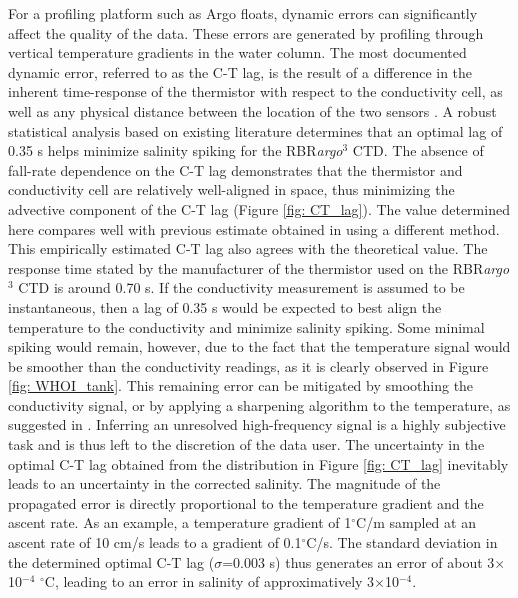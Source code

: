 \documentclass{ametsocV6.1}
\begin{document}
For a profiling platform such as Argo floats, dynamic errors can significantly affect the quality of the data. 
These errors are generated by profiling through vertical temperature gradients in the water column.
The most documented dynamic error, referred to as the C-T lag, is the result of a difference in the inherent time-response of the thermistor with respect to the conductivity cell, as well as any physical distance between the location of the two sensors \citep{Horne_1980,  Lueck_1990b}. 
A robust statistical analysis based on existing literature \citep{Barth_1996,  Dever_2020} determines that an optimal lag of 0.35 s helps minimize salinity spiking for the RBR\textit{argo}$^3$ CTD.  
The absence of fall-rate dependence on the C-T lag demonstrates that the thermistor and conductivity cell are relatively well-aligned in space, thus minimizing the advective component of the C-T lag (Figure \ref{fig: CT_lag}). 
The value determined here compares well with previous estimate obtained in \cite{Halverson_2020a} using a different method. 
This empirically estimated C-T lag also agrees with the theoretical value. The response time stated by the manufacturer of the thermistor used on the RBR\textit{argo}$^3$ CTD is around 0.70 s. 
If the conductivity measurement is assumed to be instantaneous, then a lag of 0.35 s would be expected to best align the temperature to the conductivity and minimize salinity spiking. 
Some minimal spiking would remain, however, due to the fact that the temperature signal would be smoother than the conductivity readings, as it is clearly observed in Figure \ref{fig: WHOI_tank}. 
This remaining error can be mitigated by smoothing the conductivity signal, or by applying a sharpening algorithm to the temperature, as suggested in \cite{Halverson_2020a}. 
Inferring an unresolved high-frequency signal is a highly subjective task and is thus left to the discretion of the data user. 
The uncertainty in the optimal C-T lag obtained from the distribution in Figure \ref{fig: CT_lag} inevitably leads to an uncertainty in the corrected salinity. The magnitude of the propagated error is directly proportional to the temperature gradient and the ascent rate. 
As an example, a temperature gradient of 1$^\circ$C/m sampled at an ascent rate of 10 cm/s leads to a gradient of 0.1$^\circ$C/s. The standard deviation in the determined optimal C-T lag ($\sigma$=0.003 s) thus generates an error of about 3$\times$10$^{-4}$ $^\circ$C,  leading to an error in salinity of approximatively 3$\times$10$^{-4}$.
\end{document}
